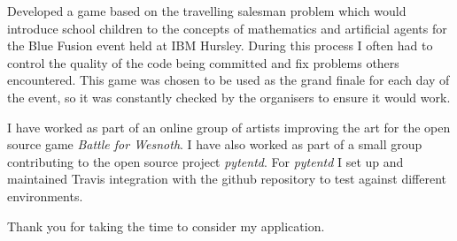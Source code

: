 \documentclass[10pt,stdletter,dateno,sigleft]{newlfm} %
\begin{document}
\begin{newlfm}





Developed a game based on the travelling salesman problem which would introduce
school children to the concepts of mathematics and artificial agents for the
Blue Fusion event held at IBM Hursley. During this process I often had to 
control the quality of the code being committed and fix problems others 
encountered.
This game was chosen to be used as the grand finale for each day of the event,
so it was constantly checked by the organisers to ensure it would work.

I have worked as part of an online group of artists improving the art for the
open source game \textit{Battle for Wesnoth}. I have also worked as part of a small 
group contributing to the open source project \textit{pytentd}. For \textit{pytentd} I
set up and maintained Travis integration with the github repository to test against
different environments.




 

Thank you for taking the time to consider my application.


\end{newlfm}
\end{document}
